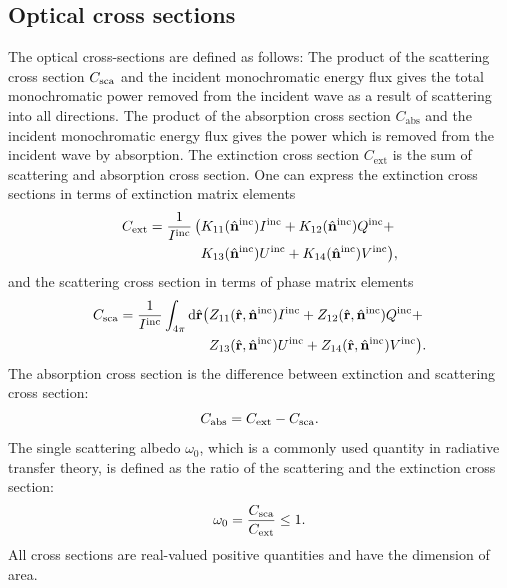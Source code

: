 \subsection{Optical cross sections}
\label{sec:rtetheory:cross_sects}

The optical cross-sections are defined as follows: The product of the
scattering cross section $C_{\mathrm{sca}}$ and the incident monochromatic
energy flux gives the total monochromatic power removed from the
incident wave as a result of scattering into all directions. The
product of the absorption cross section $C_{\mathrm{abs}}$ and the incident
monochromatic energy flux gives the power which is removed from the
incident wave by absorption. The extinction cross section $C_{\mathrm{ext}}$ is
the sum of scattering and absorption cross section.  One can express
the extinction cross sections in terms of extinction matrix elements
\begin{eqnarray}\label{eq:rtetheory:ext_cross_sec}
    C_{\mathrm{ext}} =
      \frac{1}{I^{\mathrm{inc}}} \, \bigl( &
                K_{11}(\hat{\mathbf{n}}^{\mathrm{inc}})I^{\mathrm{inc}}
             +  K_{12}(\hat{\mathbf{n}}^{\mathrm{inc}})Q^{\mathrm{inc}} + \\
         &      K_{13}(\hat{\mathbf{n}}^{\mathrm{inc}})U^{\mathrm{inc}}
             +  K_{14}(\hat{\mathbf{n}}^{\mathrm{inc}})V^{\mathrm{inc}} \bigr),  
\end{eqnarray}
and the scattering cross section in terms of phase matrix elements
\begin{eqnarray}\label{eq:rtetheory:sca_cross_sec}
  C_{\mathrm{sca}} =
      \frac{1}{I^{\mathrm{inc}}} \int_{4\pi} \mathrm{d}\hat{\mathbf{r}}
    \bigl(&
          Z_{11}(\hat{\mathbf{r}}, \hat{\mathbf{n}}^{\mathrm{inc}})I^{\mathrm{inc}}
        + Z_{12}(\hat{\mathbf{r}}, \hat{\mathbf{n}}^{\mathrm{inc}})Q^{\mathrm{inc}} + \\
     &    Z_{13}(\hat{\mathbf{r}}, \hat{\mathbf{n}}^{\mathrm{inc}})U^{\mathrm{inc}} +
              Z_{14}({\hat{\mathbf{r}}, \hat{\mathbf{n}}^{\mathrm{inc}}})V^{\mathrm{inc}} \bigr).
\end{eqnarray}
The absorption cross section is the difference between extinction and
scattering cross section:
\begin{equation}
  \label{eq:rtetheory:abs_cross_sec}
  C_{\mathrm{abs}} = C_{\mathrm{ext}} - C_{\mathrm{sca}}. 
\end{equation}
The single scattering albedo $\omega_0$, which is a commonly used
quantity in radiative transfer theory, is defined as the ratio of the
scattering and the extinction cross section:
\begin{equation}
  \omega_0 = \frac{C_{\mathrm{sca}}}{C_{\mathrm{ext}}} \le 1.
\end{equation}
All cross sections are real-valued positive quantities and have the
dimension of area.

